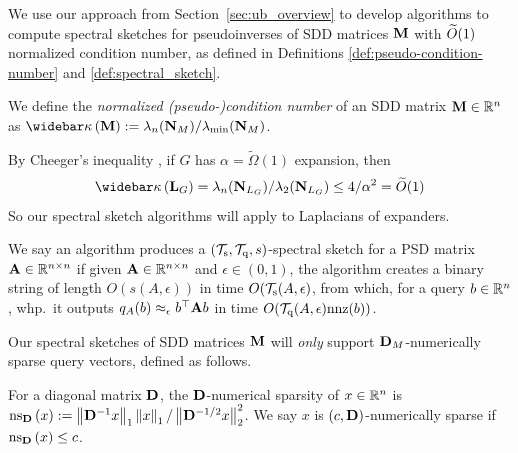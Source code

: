 We use our approach from Section~\ref{sec:ub_overview} to develop algorithms to compute spectral sketches for pseudoinverses of SDD matrices $\mathbf{M}$ with $\widetilde{O}( {1} )$ normalized condition number, as defined in Definitions \ref{def:pseudo-condition-number} and \ref{def:spectral_sketch}.

\begin{definition}\label{def:pseudo-condition-number} We define the \emph{normalized (pseudo-)condition number} of an SDD matrix $\mathbf{M} \in \mathbb{R}^n$ as
$
    \pcondOf{\M} \defeq \lambda_n(\normalized{M})/\lambdamin(\normalized{M})
$.
\end{definition}

By Cheeger's inequality \cite{Cheeger}, if $G$ has $\alpha = \widetilde{\Omega}(1)$ expansion, then 
\begin{align*}
    \pcondOf{\laplacian{G}} = \lambda_n(\normalized{L_G})/\lambda_2(\normalized{L_G}) \leq4/\alpha^2 = \Otilde{1}
\end{align*}
So our spectral sketch algorithms will apply to Laplacians of expanders. 

\begin{definition}\label{def:spectral_sketch} We say an algorithm produces a $(\mathcal{T}_{\mathrm{s}}, \mathcal{T}_{\mathrm{q}}, s)$-spectral sketch for a PSD matrix $\mathbf{A} \in \mathbb{R}^{n \times n}$ if given $\mathbf{A} \in \mathbb{R}^{n \times n}$ and $\epsilon \in (0, 1)$, the algorithm creates a binary string of length $O(s(A, \epsilon))$ in time $O(\mathcal{T}_{\mathrm{s}}(A, \epsilon)$, from which, for a query $b \in \mathbb{R}^n$, whp.\ it outputs $q_A(b) \approx_\epsilon b^\top \mathbf{A} b$ in time $O(\mathcal{T}_{\mathrm{q}}(A, \epsilon) \mathrm{nnz}(b))$. 
\end{definition}

Our spectral sketches of SDD matrices $\mathbf{M}$ will \emph{only} support ${\mathbf{D}}_{M}$-numerically sparse query vectors, defined as follows.
\begin{definition}\label{def:D_numerically_sparse} For a diagonal matrix $\mathbf{D}$, the $\mathbf{D}$-numerical sparsity of $x \in \mathbb{R}^n$ is $\mathrm{ns}_{\mathbf{D}}\left({x}\right) := \left\Vert  \mathbf{D}^{-1} x \right\Vert_1 \left\Vert x \right\Vert_1/\left\Vert \mathbf{D}^{-1/2} x \right\Vert_2^2$. We say $x$ is $(c, \mathbf{D})$-numerically sparse if $\mathrm{ns}_{\mathbf{D}}\left({x}\right) \leq c$. 
\end{definition}

